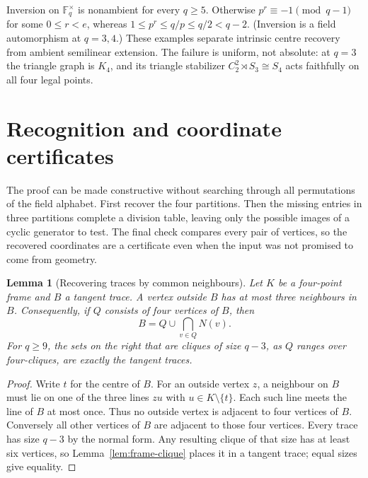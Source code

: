 \documentclass[11pt]{article}
\newtheorem{lemma}[theorem]{Lemma}
\theoremstyle{definition}
\theoremstyle{remark}
\newcommand{\F}{\mathbb F}
\begin{document}
Inversion on $\F_q^\times$ is nonambient for every $q\ge5$.
Otherwise $p^r\equiv-1\pmod{q-1}$ for some $0\le r<e$, whereas
$1\le p^r\le q/p\le q/2<q-2$. (Inversion is a field automorphism
at $q=3,4$.) These examples separate
intrinsic centre recovery from ambient semilinear extension. The failure
is uniform, not absolute: at $q=3$ the triangle graph is $K_4$, and its
triangle stabilizer $C_2^2\rtimes S_3\cong S_4$ acts faithfully on all four
legal points.

\section{Recognition and coordinate certificates}\label{sec:algorithm}

The proof can be made constructive without searching through all
permutations of the field alphabet. First recover the four partitions.
Then the missing entries in three partitions complete a division table, leaving
only the possible images of a cyclic generator to test. The final check
compares every pair of vertices, so the recovered coordinates are a
certificate even when the input was not promised to come from geometry.

\begin{lemma}[Recovering traces by common neighbours]\label{lem:seeds}
Let $K$ be a four-point frame and $B$ a tangent trace. A vertex outside
$B$ has at most three neighbours in $B$. Consequently, if $Q$ consists
of four vertices of $B$, then
\[
 B=Q\cup\bigcap_{v\in Q}N(v).
\]
For $q\ge9$, the sets on the right that are cliques of size $q-3$,
as $Q$ ranges over four-cliques, are exactly the tangent traces.
\end{lemma}
\begin{proof}
Write $t$ for the centre of $B$. For an outside vertex $z$, a neighbour
on $B$ must lie on one of the three lines $zu$ with $u\in K\setminus\{t\}$.
Each such line meets the line of $B$ at most once. Thus no outside vertex
is adjacent to four vertices of $B$. Conversely all other vertices of
$B$ are adjacent to those four vertices. Every trace has size $q-3$ by
the normal form. Any resulting clique of that size has at least six
vertices, so Lemma~\ref{lem:frame-clique} places it in a tangent trace; equal
sizes give equality.
\end{proof}
\end{document}
